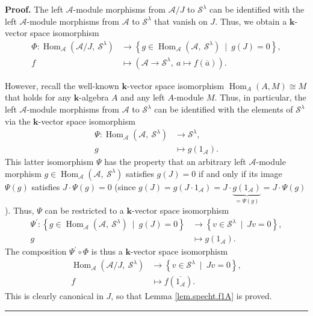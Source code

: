 \documentclass[numbers=enddot,12pt,final,onecolumn,notitlepage]{scrartcl}%
\theoremstyle{definition}
\newenvironment{proof}[1][Proof]{\noindent\textbf{#1.} }{\ \rule{0.5em}{0.5em}}
\begin{document}
\begin{proof}
The left $\mathcal{A}$-module morphisms from $\mathcal{A}/J$ to $\mathcal{S}%
^{\lambda}$ can be identified with the left $\mathcal{A}$-module morphisms
from $\mathcal{A}$ to $\mathcal{S}^{\lambda}$ that vanish on $J$. Thus, we
obtain a $\mathbf{k}$-vector space isomorphism%
\begin{align*}
\Phi:\operatorname*{Hom}\nolimits_{\mathcal{A}}\left(  \mathcal{A}%
/J,\ \mathcal{S}^{\lambda}\right)   &  \rightarrow\left\{  g\in
\operatorname*{Hom}\nolimits_{\mathcal{A}}\left(  \mathcal{A},\ \mathcal{S}%
^{\lambda}\right)  \ \mid\ g\left(  J\right)  =0\right\}  ,\\
f  &  \mapsto\left(  \mathcal{A}\rightarrow\mathcal{S}^{\lambda},\ a\mapsto
f\left(  \overline{a}\right)  \right)  .
\end{align*}


However, recall the well-known $\mathbf{k}$-vector space isomorphism
$\operatorname*{Hom}\nolimits_{A}\left(  A,M\right)  \cong M$ that holds for
any $\mathbf{k}$-algebra $A$ and any left $A$-module $M$. Thus, in particular,
the left $\mathcal{A}$-module morphisms from $\mathcal{A}$ to $\mathcal{S}%
^{\lambda}$ can be identified with the elements of $\mathcal{S}^{\lambda}$ via
the $\mathbf{k}$-vector space isomorphism
\begin{align*}
\Psi:\operatorname*{Hom}\nolimits_{\mathcal{A}}\left(  \mathcal{A}%
,\ \mathcal{S}^{\lambda}\right)   &  \rightarrow\mathcal{S}^{\lambda},\\
g  &  \mapsto g\left(  1_{\mathcal{A}}\right)  .
\end{align*}
This latter isomorphism $\Psi$ has the property that an arbitrary
left $\mathcal{A}$-module
morphism $g\in\operatorname*{Hom}\nolimits_{\mathcal{A}}\left(  \mathcal{A}%
,\ \mathcal{S}^{\lambda}\right)  $ satisfies $g\left(  J\right)  =0$ if and
only if its image $\Psi\left(  g\right)  $ satisfies $J\cdot\Psi\left(
g\right)  =0$ (since $g\left(  J\right)  =g\left(  J\cdot1_{\mathcal{A}%
}\right)  =J\cdot\underbrace{g\left(  1_{\mathcal{A}}\right)  }_{=\Psi\left(
g\right)  }=J\cdot\Psi\left(  g\right)  $). Thus, $\Psi$ can be restricted to
a $\mathbf{k}$-vector space isomorphism
\begin{align*}
\Psi^{\prime}:\left\{  g\in\operatorname*{Hom}\nolimits_{\mathcal{A}}\left(
\mathcal{A},\ \mathcal{S}^{\lambda}\right)  \ \mid\ g\left(  J\right)
=0\right\}   &  \rightarrow\left\{  v\in\mathcal{S}^{\lambda}\ \mid
\ Jv=0\right\}  ,\\
g  &  \mapsto g\left(  1_{\mathcal{A}}\right)  .
\end{align*}
The composition $\Psi^{\prime}\circ\Phi$ is thus a $\mathbf{k}$-vector space
isomorphism%
\begin{align*}
\operatorname*{Hom}\nolimits_{\mathcal{A}}\left(  \mathcal{A}/J,\ \mathcal{S}%
^{\lambda}\right)   &  \rightarrow\left\{  v\in\mathcal{S}^{\lambda}%
\ \mid\ Jv=0\right\}  ,\\
f  &  \mapsto f\left(  \overline{1_{\mathcal{A}}}\right)  .
\end{align*}
This is clearly canonical in $J$, so that Lemma \ref{lem.specht.f1A} is proved.
\end{proof}
\end{document}

